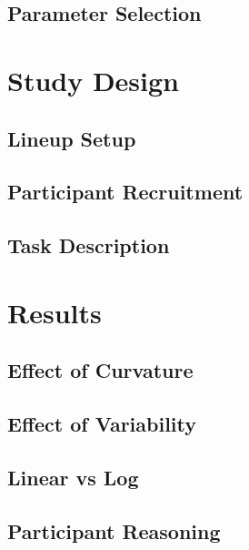 \documentclass[]{interact}
\theoremstyle{plain}%
\theoremstyle{definition}
\theoremstyle{remark}
\begin{document}
\hypertarget{parameter-selection}{%
\subsection{Parameter Selection}\label{parameter-selection}}

\hypertarget{study-design}{%
\section{Study Design}\label{study-design}}

\hypertarget{lineup-setup}{%
\subsection{Lineup Setup}\label{lineup-setup}}

\hypertarget{participant-recruitment}{%
\subsection{Participant Recruitment}\label{participant-recruitment}}

\hypertarget{task-description}{%
\subsection{Task Description}\label{task-description}}

\hypertarget{results}{%
\section{Results}\label{results}}

\hypertarget{effect-of-curvature}{%
\subsection{Effect of Curvature}\label{effect-of-curvature}}

\hypertarget{effect-of-variability}{%
\subsection{Effect of Variability}\label{effect-of-variability}}

\hypertarget{linear-vs-log}{%
\subsection{Linear vs Log}\label{linear-vs-log}}

\hypertarget{participant-reasoning}{%
\subsection{Participant Reasoning}\label{participant-reasoning}}
\end{document}
